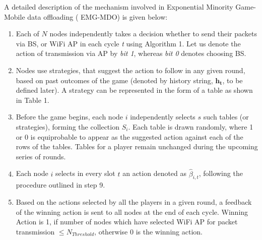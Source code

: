 A detailed description of the mechanism involved in Exponential Minority Game-Mobile data offloading ( EMG-MDO) is given below:
\begin{enumerate}
    \item Each of $N$ nodes independently takes a decision whether to send their packets via BS, or WiFi AP in each cycle \textit{t} using Algorithm 1. Let us denote the action of transmission via AP by \textit{bit 1}, whereas \textit{bit 0} denotes choosing BS.
    \item Nodes use strategies, that suggest the action to follow
in any given round, based on past outcomes of the game
(denoted by history string, $\mathbf{h_t}$, to be defined later). A
strategy can be represented in the form of a table as
shown in Table 1.
\item Before the game begins, each node $i$ independently selects
$s$ such tables (or strategies), forming the collection $S_i$. Each table is drawn randomly, where 1 or 0 is equiprobable to appear as the suggested action against each of the rows of the tables.
Tables for
a player remain unchanged during the upcoming series of
rounds.
\item Each node $i$ selects in every slot $t$ an action denoted as ${\hat{\beta}}_{i,t}$, following the procedure outlined in step 9.
\item Based on the actions selected by all the players in a given
round, a feedback of the winning action is sent to all
nodes at the end of each cycle. 
Winning Action is 1, if number  of nodes which have selected WiFi AP for packet transmission $\leq N_{Threshold}$, otherwise 0 is the winning action.


\end{enumerate}
